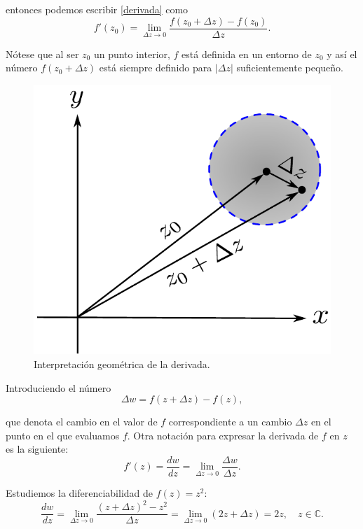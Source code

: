 entonces podemos escribir \eqref{derivada} como
$$f'(z_0) = \lim_{\Delta z \to 0} \frac{f(z_0 + \Delta z) - f(z_0)}{\Delta z}.$$

Nótese que al ser $z_0$ un punto interior,  $f$ está definida en un entorno de $z_0$ y así el número $f(z_0 + \Delta z)$ está siempre definido para $|\Delta z|$ suficientemente pequeño. 

\begin{figure}[H]
    \centering
    \includegraphics[scale=0.55]{Figuras/DefDerivada.pdf}
    \caption{Interpretación geométrica de la derivada.}
    \label{GeoDerivada}
\end{figure}

Introduciendo el número
$$\Delta w = f(z + \Delta z) - f(z),$$

que denota el cambio en el valor de $f$ correspondiente a un cambio $\Delta z$ en el punto en el que evaluamos $f$. Otra notación para expresar la derivada de $f$ en $z$ es la siguiente:
$$f'(z) = \frac{dw}{dz} = \lim_{\Delta z \to 0} \frac{\Delta w}{\Delta z}.$$

\begin{ejemplo}
Estudiemos la diferenciabilidad de $f(z) = z^2$:
$$\frac{dw}{dz} = \lim_{\Delta z \to 0} \frac{(z + \Delta z)^2 -z^2}{\Delta z} = \lim_{\Delta z \to 0} (2z + \Delta z) = 2z, \quad z \in \mathbb{C}.$$
\end{ejemplo}

